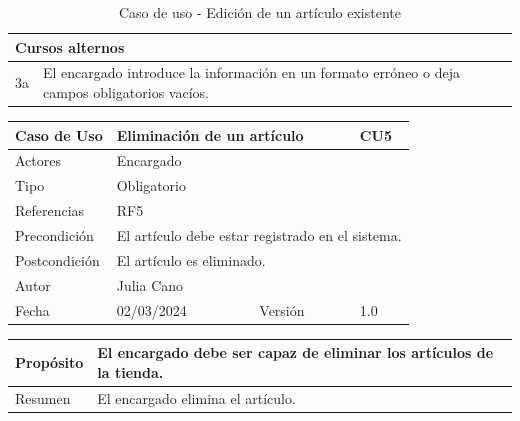 \begin{table}[H]
	\centering
	\begin{tabular}{| m{} | m{} | m{} | m{} |}
		\hline
		\multicolumn{4}{|m{0.9\textwidth}|}{Cursos alternos}     \\ 
		\hline
		3a & \multicolumn{3}{m{0.67\textwidth}|}{El encargado introduce la información en un formato erróneo o deja campos obligatorios vacíos.} \\ 
		\hline
	\end{tabular}
	\caption{Caso de uso - Edición de un artículo existente}
\end{table}

\newpage


\begin{table}[H]
	\centering
	\begin{tabular}{| m{} | m{} | m{} | m{} |}
		\hline
		\rowcolor{grayshade} Caso de Uso & \multicolumn{2}{|m{0.43\textwidth}|}{Eliminación de un artículo} &  CU5\\ 
		\hline
		Actores & \multicolumn{3}{l|}{Encargado} \\ 
		\hline
		Tipo & \multicolumn{3}{l|}{Obligatorio} \\ 
		\hline
		Referencias & \multicolumn{3}{l|}{RF5} \\ 
		\hline
		Precondición & \multicolumn{3}{m{0.67\textwidth}|}{El artículo debe estar registrado en el sistema.} \\ 
		\hline
		Postcondición & \multicolumn{3}{l|}{El artículo es eliminado.} \\ 
		\hline
		Autor & \multicolumn{3}{l|}{Julia Cano} \\ 
		\hline
		Fecha & 02/03/2024 & Versión & 1.0 \\
		\hline
	\end{tabular}
\end{table}

\begin{table}[H]
	\centering
	\begin{tabular}{| m{} | m{} | m{} | m{} |}
		\hline
		Propósito & \multicolumn{3}{m{0.67\textwidth}|}{El encargado debe ser capaz de eliminar los artículos de la tienda.}   \\ 
		\hline
		Resumen & \multicolumn{3}{m{0.67\textwidth}|}{El encargado elimina el artículo.} \\ 
		\hline
	\end{tabular}
\end{table}


